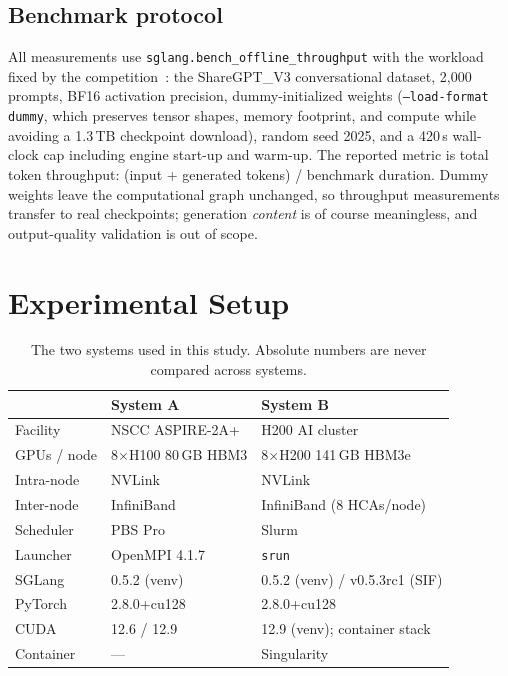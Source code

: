 \documentclass[sigconf]{acmart}
\begin{document}
\subsection{Benchmark protocol}
All measurements use \texttt{sglang.bench\_offline\_throughput} with the workload fixed by the competition~\cite{apachpcai2025}: the ShareGPT\_V3 conversational dataset, 2{,}000 prompts, BF16 activation precision, dummy-initialized weights (\texttt{--load-format dummy}, which preserves tensor shapes, memory footprint, and compute while avoiding a 1.3\,TB checkpoint download), random seed 2025, and a 420\,s wall-clock cap including engine start-up and warm-up. The reported metric is total token throughput: (input + generated tokens) / benchmark duration. Dummy weights leave the computational graph unchanged, so throughput measurements transfer to real checkpoints; generation \emph{content} is of course meaningless, and output-quality validation is out of scope.

\section{Experimental Setup}
\label{sec:setup}

\begin{table}
\caption{The two systems used in this study. Absolute numbers are never compared across systems.}
\label{tab:systems}
\small
\begin{tabular}{@{}lll@{}}
\toprule
 & \textbf{System A} & \textbf{System B} \\
\midrule
Facility & NSCC ASPIRE-2A+ & H200 AI cluster \\
GPUs / node & 8$\times$H100 80\,GB HBM3 & 8$\times$H200 141\,GB HBM3e \\
Intra-node & NVLink & NVLink \\
Inter-node & InfiniBand & InfiniBand (8 HCAs/node) \\
Scheduler & PBS Pro & Slurm \\
Launcher & OpenMPI 4.1.7 & \texttt{srun} \\
SGLang & 0.5.2 (venv) & 0.5.2 (venv) / v0.5.3rc1 (SIF) \\
PyTorch & 2.8.0+cu128 & 2.8.0+cu128 \\
CUDA & 12.6 / 12.9 & 12.9 (venv); container stack \\
Container & --- & Singularity \\
\bottomrule
\end{tabular}
\end{table}
\end{document}
